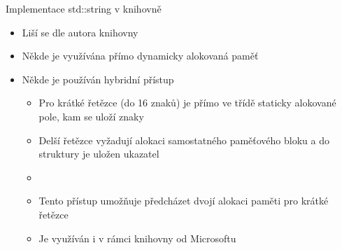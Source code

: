 \begin{frame}[fragile]
\begin{block}{Implementace std::string v knihovně}
\begin{itemize}
\item Liší se dle autora knihovny
\item Někde je využívána přímo dynamicky alokovaná paměť
\item Někde je používán hybridní přístup
\begin{itemize}
\item Pro krátké řetězce (do 16 znaků) je přímo ve třídě staticky alokované pole, kam se uloží znaky
\item Delší řetězce vyžadují alokaci samostatného paměťového bloku a do struktury je uložen ukazatel
\item[] 
\item Tento přístup umožňuje předcházet dvojí alokaci paměti pro krátké řetězce
\item Je využíván i v rámci knihovny od Microsoftu
\end{itemize}
\end{itemize}
\end{block}
\end{frame}


\begin{frame}[fragile]

\end{frame}



\zkouskove
